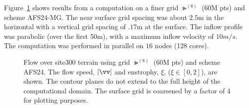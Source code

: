 \documentclass[11pt]{article}
\begin{document}
Figure~\ref{fig:terrainFlowG8} shows results from a computation on a finer grid $\Gt^{(8)}$ (60M pts) and scheme AFS24-MG.
The near surface grid spacing was about $2.5$m in the horizontal with a vertical grid spacing of $.17$m at the surface. 
The inflow profile was parabolic (over the first 50m), with a maximum inflow
velocity of $10 m/s$.
The computation was performed in parallel on $16$ nodes (128 cores). 

{%
\newcommand{\figWidthb}{7.5cm}
\newcommand{\trimfigb}[2]{\trimPlotb{#1}{#2}{.0}{.0}{.11}{.25}}
% 
\begin{figure}[hbt]
\begin{center}
\end{center}
 \caption{Flow over site300 terrain using grid $\Gt^{(8)}$ (60M pts) and scheme AFS24. The flow speed, $\vert\vv\vert$ and 
     enstrophy, $\xi$, ($\xi\in[0,2]$), are shown.
     The contour planes do not extend to the full height of the computational domain.
     The surface grid is coarsened by a factor of 4 for plotting purposes. }
  \label{fig:terrainFlowG8}
\end{figure}
%
}%

\vfill\eject




\printindex
\end{document}
